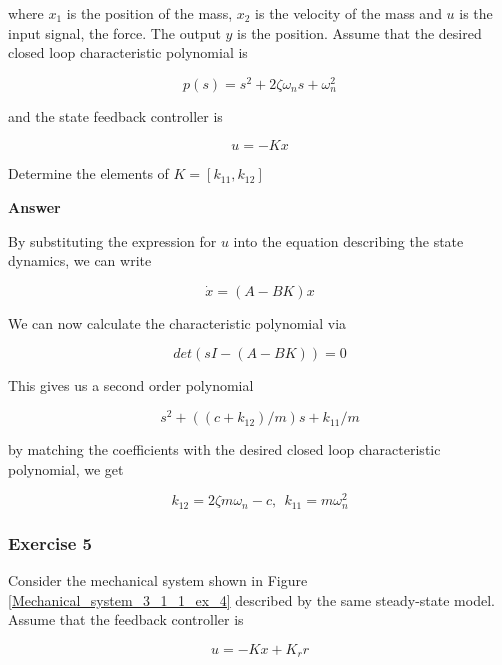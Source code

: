 where $x_1$ is the position of the mass, $x_2$ is the velocity of the mass and $u$ is the input signal, the force. The output $y$ is the position. Assume that the desired closed loop characteristic polynomial is

\begin{equation}
p(s) = s^2 + 2\zeta \omega_n s +\omega_{n}^{2}  
\end{equation}

and the state feedback controller is 

\begin{equation}
u = -Kx  
\end{equation}

Determine the elements of $K=[k_{11}, k_{12}]$

\textbf{Answer}

By substituting the expression for $u$ into the equation describing the state dynamics, we can write

\begin{equation}
\dot{x} = (A - BK)x
\end{equation}

We can now calculate the characteristic polynomial via


\begin{equation}
det(s I - (A - BK)) = 0
\end{equation}

This gives us a second order polynomial

\begin{equation}
s^2 + ((c + k_{12})/m)s + k_{11}/m
\end{equation}

by matching the coefficients with the desired closed loop characteristic polynomial, we get

\begin{equation}
k_{12} = 2 \zeta m\omega_{n} -c, ~~ k_{11} = m \omega_{n}^{2}
\end{equation}

\subsubsection{Exercise 5}

Consider the mechanical system shown in Figure \ref{Mechanical_system_3_1_1_ex_4} described by the same steady-state model. Assume that the feedback controller is

\begin{equation}
u = -Kx + K_r r 
\end{equation} 

